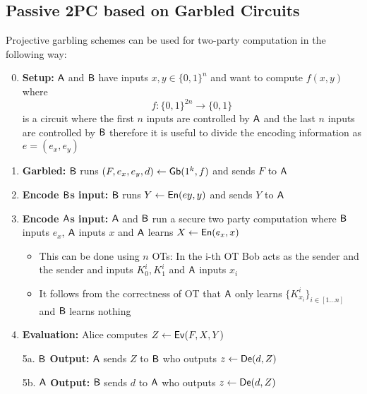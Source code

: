 \subsection{Passive 2PC based on Garbled Circuits}
Projective garbling schemes can be used for two-party computation in the following way:
\begin{enumerate}
    \setcounter{enumi}{-1}
    \item \textbf{Setup:} $\mathsf{A}$ and $\mathsf{B}$ have inputs $x,y \in \{0,1\}^n$ and want to compute $f(x,y)$ where
    \begin{equation*}
        f: \{0,1\}^{2n} \to \{0,1\}
    \end{equation*}
    is a circuit where the first $n$ inputs are controlled by $\mathsf{A}$ and the last $n$ inputs are controlled by $\mathsf{B}$ therefore it is useful to divide the encoding information as $e = (e_x, e_y)$
    \item \textbf{Garbled:} $\mathsf{B}$ runs $(F, e_x, e_y, d) \leftarrow \mathsf{Gb}(1^k, f)$ and sends $F$ to $\mathsf{A}$
    \item \textbf{Encode $\mathsf{B}$s input:} $\mathsf{B}$ runs $Y \leftarrow \mathsf{En}(ey,y)$ and sends $Y$ to $\mathsf{A}$
    \item \textbf{Encode $\mathsf{A}$s input:} $\mathsf{A}$ and $\mathsf{B}$ run a secure two party computation where $\mathsf{B}$ inputs $e_x$, $\mathsf{A}$ inputs $x$ and $\mathsf{A}$ learns $X \leftarrow \mathsf{En}(e_x, x)$
    \begin{itemize}
        \item This can be done using $n$ OTs: In the i-th OT Bob acts as the sender and the sender and inputs $K_0^i, K_1^i$ and $\mathsf{A}$ inputs $x_i$
        \item It follows from the correctness of OT that $\mathsf{A}$ only learns $\{K_{x_i}^i\}_{i \in [1 \dots n]}$ and $\mathsf{B}$ learns nothing
    \end{itemize}
    \item \textbf{Evaluation:} Alice computes $Z \leftarrow \mathsf{Ev}(F, X, Y)$
    \item[5a.] \textbf{$\mathsf{B}$ Output:} $\mathsf{A}$ sends $Z$ to $\mathsf{B}$ who outputs $z \leftarrow \mathsf{De}(d, Z)$
    \item[5b.] \textbf{$\mathsf{A}$ Output:} $\mathsf{B}$ sends $d$ to $\mathsf{A}$ who outputs $z \leftarrow \mathsf{De}(d, Z)$
\end{enumerate}
